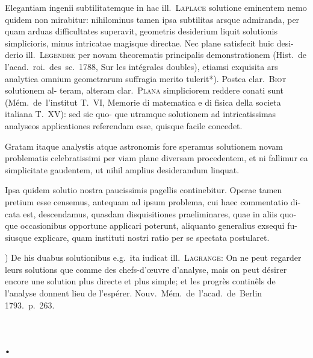 \documentclass[12pt,a4paper]{article}
\theoremstyle{gauss}
\begin{document}
Elegantiam ingenii subtilitatemque in hac ill.~\textsc{Laplace} solutione eminentem
nemo quidem non mirabitur: nihilominus tamen ipsa subtilitas arsque admiranda,
per quam arduas difficultates superavit, geometris desiderium liquit solutionis
simplicioris, minus intricatae magisque directae. Nec plane satisfecit huic desi-
derio ill.~\textsc{Legendre} per novam theorematis principalis demonstrationem (Hist.~de
l'acad.~roi.~des~sc.~1788, Sur les int\'egrales doubles), etiamsi exquisita ars analytica
omnium geometrarum suffragia merito tulerit*). Postea clar.~\textsc{Biot} solutionem al-
teram, alteram clar.~\textsc{Plana} simpliciorem reddere conati sunt (M\'em.~de~l'institut
T.~VI, Memorie di matematica e di fisica della societa italiana T.~XV): sed sic quo-
que utramque solutionem ad intricatissimas analyseos applicationes referendam
esse, quisque facile concedet.

Gratam itaque analystis atque astronomis fore speramus solutionem novam
problematis celebratissimi per viam plane diversam procedentem, et ni fallimur
ea simplicitate gaudentem, ut nihil amplius desiderandum linquat.

Ipsa quidem solutio nostra paucissimis pagellis continebitur. Operae tamen
pretium esse censemus, antequam ad ipsum problema, cui haec commentatio di-
cata est, descendamus, quasdam disquisitiones praeliminares, quae in aliis quo-
que occasionibus opportune applicari poterunt, aliquanto generalius exsequi fu-
siusque explicare, quam instituti nostri ratio per se spectata postularet.

\vspace{8pt}
{\footnotesize *) De his duabus solutionibus e.g.~ita iudicat ill.~\textsc{Lagrange}: On ne peut regarder leurs solutions
que comme des chefs-d'\oe{}uvre d'analyse, mais on peut d\'esirer encore une solution plus directe et plus simple;
et les progr\`es contin\^els de l'analyse donnent lieu de l'esp\'erer. Nouv.~M\'em.~de~l'acad.~de~Berlin 1793.~p.~263.}

\newpage
\setcounter{page}{13}

\section*{%
%
\thesection.}
\end{document}
